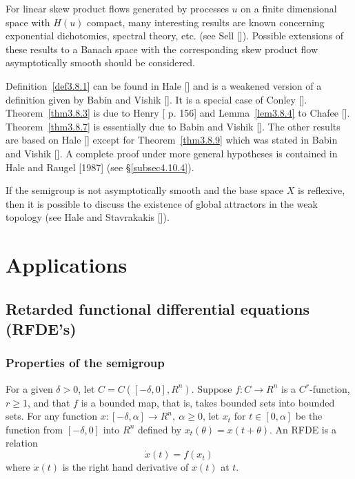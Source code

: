 \documentclass{surv-l}
\theoremstyle{plain}
\theoremstyle{definition}
\numberwithin{equation}{section}
\numberwithin{figure}{chapter}
\begin{document}
For linear skew product flows generated by processes $u$ on a finite dimensional space with $H(u)$ compact, many interesting results are known concerning exponential dichotomies, spectral theory, etc. (see Sell [\citeyear{1975s}]). Possible extensions of these results to a Banach space with the corresponding skew product flow asymptotically smooth should be considered.

Definition~\ref{def3.8.1} can be found in Hale [\citeyear{1985h}] and is a weakened version of a definition given by Babin and Vishik [\citeyear{1983bv}]. It is a special case of Conley [\citeyear{1972c}]. Theorem~\ref{thm3.8.3} is due to Henry [\citeyear{1981henry} p. 156] and Lemma~\ref{lem3.8.4} to Chafee [\citeyear{1977c}]. Theorem~\ref{thm3.8.7} is essentially due to Babin and Vishik [\citeyear{1983bv}]. The other results are based on Hale [\citeyear{1985h}] except for Theorem~\ref{thm3.8.9} which was stated in Babin and Vishik [\citeyear{1986bv}]. A complete proof under more general hypotheses is contained in Hale and Raugel [1987] (see \S\ref{subsec4.10.4}).

If the semigroup is not asymptotically smooth and the base space $X$ is reflexive, then it is possible to discuss the existence of global attractors in the weak topology (see Hale and Stavrakakis [\citeyear{1987hs}]).



\setcounter{chapter}{3}

\chapter{Applications}\label{chap04}


\section{Retarded functional differential equations (RFDE's)}\label{sec4.1}

\subsection{Properties of the semigroup}\label{subsec4.1.1} For a given $\delta >0$, let $C=C([-\delta, 0], R^{n})$. Suppose $f\!:C\rightarrow R^{n}$ is a $C^{r}$-function, $r\geq 1$, and that $f$ is a bounded map, that is, takes bounded sets into bounded sets. For any function $x\!:[-\delta, \alpha]\rightarrow R^{n},\ \alpha\geq 0$, let $x_{t}$ for $t\in[0, \alpha]$ be the function from $[-\delta, 0]$ into $R^{n}$ defined by $x_{t}(\theta)=x(t+\theta)$. An RFDE is a relation
\begin{equation}\label{chap04:eq1.1}
\dot{x}(t)=f(x_{t})
\end{equation}
where $\dot{x}(t)$ is the right hand derivative of $x(t)$ at $t$.
\end{document}
